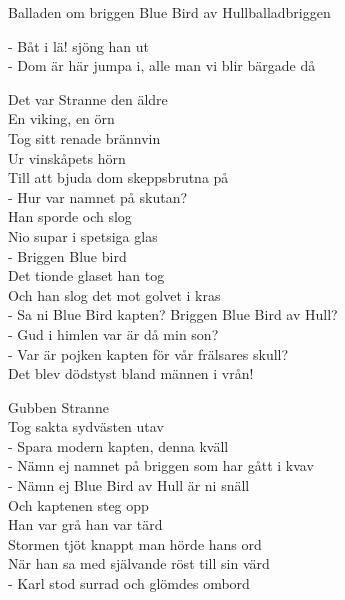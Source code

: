 \begin{song}{Balladen om briggen Blue Bird av Hull}{balladbriggen}
\begin{vers}
- Båt i lä! sjöng han ut\\
- Dom är här jumpa i, alle man vi blir bärgade då\\
\end{vers}
\begin{vers}
Det var Stranne den äldre\\
En viking, en örn\\
Tog sitt renade brännvin\\
Ur vinskåpets hörn\\
Till att bjuda dom skeppsbrutna på\\
- Hur var namnet på skutan?\\
Han sporde och slog\\
Nio supar i spetsiga glas\\
- Briggen Blue bird\\
Det tionde glaset han tog\\
Och han slog det mot golvet i kras\\
- Sa ni Blue Bird kapten? Briggen Blue Bird av Hull?\\
- Gud i himlen var är då min son?\\
- Var är pojken kapten för vår frälsares skull?\\
Det blev dödstyst bland männen i vrån!\\
\end{vers}
\begin{vers}
Gubben Stranne\\
Tog sakta sydvästen utav\\
- Spara modern kapten, denna kväll\\
- Nämn ej namnet på briggen som har gått i kvav\\
- Nämn ej Blue Bird av Hull är ni snäll\\
Och kaptenen steg opp\\
Han var grå han var tärd\\
Stormen tjöt knappt man hörde hans ord\\
När han sa med självande röst till sin värd\\
- Karl stod surrad och glömdes ombord\\
\end{vers}
\end{song}
